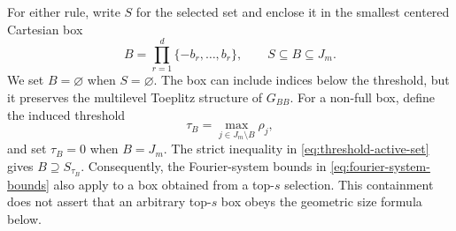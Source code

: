 For either rule, write \(S\) for the selected set and enclose it in the
smallest centered Cartesian box
\begin{equation}
    B=\prod_{r=1}^d\{-b_r,\ldots,b_r\},
    \qquad S\subseteq B\subseteq J_m.
    \label{eq:active-cartesian-box}
\end{equation}
We set \(B=\varnothing\) when \(S=\varnothing\). The box can include indices
below the threshold, but it preserves the multilevel Toeplitz structure of
\(G_{BB}\). For a non-full box, define the induced threshold
\begin{equation}
    \tau_B=\max_{j\in J_m\setminus B}\rho_j,
    \label{eq:induced-box-threshold}
\end{equation}
and set \(\tau_B=0\) when \(B=J_m\). The strict inequality in
\cref{eq:threshold-active-set} gives \(B\supseteq S_{\tau_B}\). Consequently,
the Fourier-system bounds in \cref{eq:fourier-system-bounds} also apply to a
box obtained from a top-\(s\) selection. This containment does not assert that
an arbitrary top-\(s\) box obeys the geometric size formula below.

